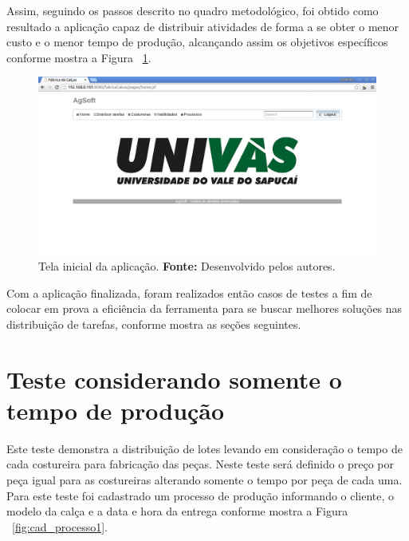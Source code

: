 \par Assim, seguindo os passos descrito no quadro metodológico, foi obtido como resultado a aplicação
capaz de distribuir atividades de forma a se obter o menor custo e o menor tempo de produção, 
alcançando assim os objetivos específicos conforme mostra a Figura ~\ref{fig:tela_inicial_da_aplicação}.

\newpage

\begin{figure}[h!]
	\centerline{\includegraphics[scale=0.3]{./imagens/tela_inicial.png}}
	\caption[Tela inicial da aplicação.]
	{Tela inicial da aplicação. \textbf{Fonte:} Desenvolvido pelos autores.}
	\label{fig:tela_inicial_da_aplicação}
\end{figure}


\par Com a aplicação finalizada, foram realizados então casos de testes a fim de colocar em prova a eficiência da ferramenta para se 
buscar melhores soluções nas distribuição de tarefas, conforme mostra as seções
seguintes.


\section{Teste considerando somente o tempo de produção}

\par Este teste demonstra a distribuição de lotes levando em consideração o
tempo de cada costureira para fabricação das peças. Neste teste será definido o
preço por peça igual para as costureiras alterando somente o tempo por peça de
cada uma. Para este teste foi cadastrado um processo de produção informando o
cliente, o modelo da calça e a data e hora da entrega conforme mostra a Figura
~\ref{fig:cad_processo1}.

\newpage

